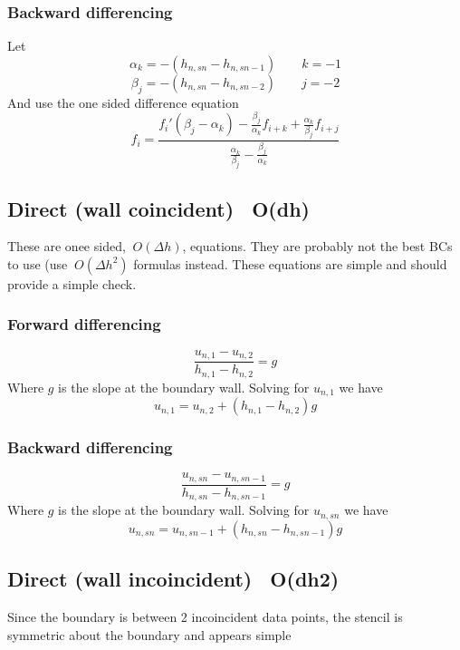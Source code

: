 \documentclass[11pt]{article}
\begin{document}
\subsubsection{Backward differencing}
Let
\begin{equation}
	\alpha_k = -(h_{n,sn} - h_{n,sn-1})  \qquad k = -1
\end{equation}
\begin{equation}
	\beta_j = -(h_{n,sn} - h_{n,sn-2})  \qquad j = -2
\end{equation}
And use the one sided difference equation
\begin{equation}
	f_i = \frac{f_i' (\beta_j - \alpha_k) - \frac{\beta_j}{\alpha_k} f_{i+k} + \frac{\alpha_k}{\beta_j} f_{i+j}}{\frac{\alpha_k}{\beta_j} - \frac{\beta_j}{\alpha_k}}
\end{equation}

\subsection{Direct (wall coincident) ~O(dh)}
These are onee sided, $~O(\Delta h)$, equations. They are probably not the best BCs to use (use $~O(\Delta h^2)$ formulas instead. These equations are simple and should provide a simple check.
\subsubsection{Forward differencing}
\begin{equation}
	\frac{u_{n,1}-u_{n,2}}{h_{n,1}-h_{n,2}} = g
\end{equation}
Where $g$ is the slope at the boundary wall. Solving for $u_{n,1}$ we have
\begin{equation}
	u_{n,1} = u_{n,2} + (h_{n,1}-h_{n,2})g
\end{equation}
\subsubsection{Backward differencing}
\begin{equation}
	\frac{u_{n,sn}-u_{n,sn-1}}{h_{n,sn}-h_{n,sn-1}} = g
\end{equation}
Where $g$ is the slope at the boundary wall. Solving for $u_{n,sn}$ we have
\begin{equation}
	u_{n,sn} = u_{n,sn-1} + (h_{n,sn}-h_{n,sn-1})g
\end{equation}

\subsection{Direct (wall incoincident) ~O(dh2)}
Since the boundary is between 2 incoincident data points, the stencil is symmetric about the boundary and appears simple
\end{document}

